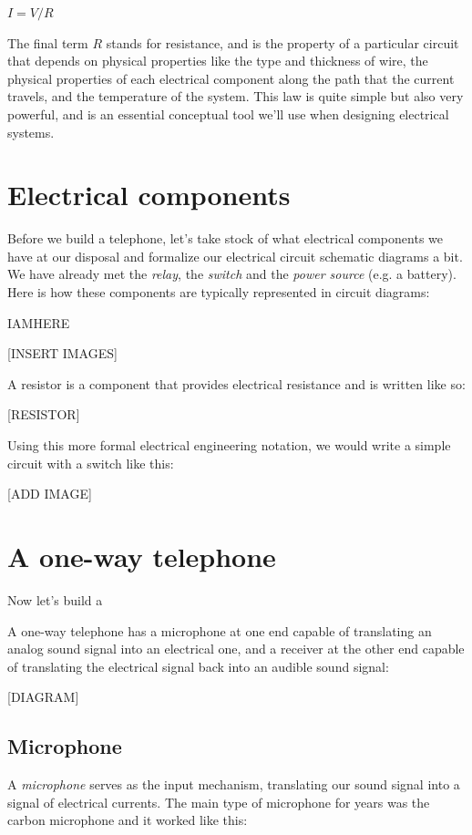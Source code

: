 \documentclass[UTF8]{book}
\begin{document}
\begin{CJK}{UTF8}{gbsn}
$I = V/R$

The final term $R$ stands for resistance, and is the property of a particular circuit that depends on physical properties like the type and thickness of wire, the physical properties of each electrical component along the path that the current travels, and the temperature of the system. This law is quite simple but also very powerful, and is an essential conceptual tool we'll use when designing electrical systems.

\section{Electrical components}

Before we build a telephone, let's take stock of what electrical components we have at our disposal and formalize our electrical circuit schematic diagrams a bit. We have already met the \emph{relay}, the \emph{switch} and the \emph{power source} (e.g. a battery). Here is how these components are typically represented in circuit diagrams:

IAMHERE

[INSERT IMAGES]

A resistor is a component that provides electrical resistance and is written like so:

[RESISTOR]

Using this more formal electrical engineering notation, we would write a simple circuit with a switch like this:

[ADD IMAGE]



\section{A one-way telephone}

Now let's build a

A one-way telephone has a microphone at one end capable of translating an analog sound signal into an electrical one, and a receiver at the other end capable of translating the electrical signal back into an audible sound signal:

[DIAGRAM]

\subsection{Microphone}

A \emph{microphone} serves as the input mechanism, translating our sound signal into a signal of electrical currents. The main type of microphone for years was the carbon microphone and it worked like this:


\end{CJK}
\end{document}
